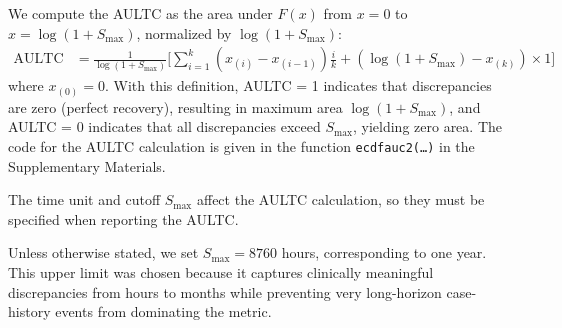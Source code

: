 
We compute the AULTC as the area under $F(x)$ from $x = 0$ to $x = \log(1 + S_{\text{max}})$, normalized by $\log(1 + S_{\text{max}})$:
\begin{align*}
\text{AULTC} &= \frac{1}{\log(1 + S_{\text{max}})} \Bigg[ \sum_{i=1}^k (x_{(i)} - x_{(i-1)}) \frac{i}{k} + (\log(1 + S_{\text{max}}) - x_{(k)}) \times 1 \Bigg]
\end{align*}
where $x_{(0)} = 0$. With this definition, AULTC = 1 indicates that discrepancies are zero (perfect recovery), resulting in maximum area $\log(1 + S_{\text{max}})$, and AULTC = 0 indicates that all discrepancies exceed $S_{\text{max}}$, yielding zero area. 
The code for the AULTC calculation is given in the function \texttt{ecdf\textunderscore auc2(\dots)} in the Supplementary Materials.


\begin{remark}
The time unit and cutoff $S_\text{max}$ affect the AULTC calculation, so they must be specified when reporting the AULTC.
\end{remark}
Unless otherwise stated, we set $S_{\max}=8760$ hours, corresponding to one year.
This upper limit was chosen because it captures clinically meaningful discrepancies from hours to months while preventing very long-horizon case-history events from dominating the metric.

